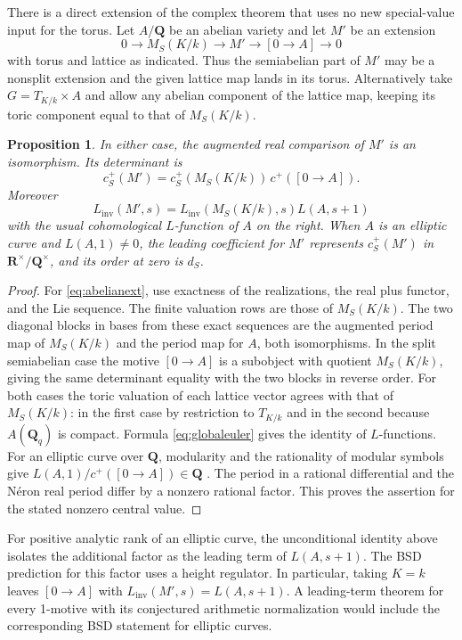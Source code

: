 \documentclass[11pt]{amsart}
\numberwithin{equation}{section}
\newtheorem{proposition}[theorem]{Proposition}
\theoremstyle{definition}
\theoremstyle{remark}
\newcommand{\Q}{\mathbf Q}
\newcommand{\R}{\mathbf R}
\begin{document}
There is a direct extension of the complex theorem that uses
no new special-value input for the torus. Let $A/\Q$ be an
abelian variety and let $M'$ be an extension
\begin{equation}\label{eq:abelianext}
 0\longrightarrow M_S(K/k)\longrightarrow M'
 \longrightarrow [0\to A]\longrightarrow0
\end{equation}
with torus and lattice as indicated. Thus the semiabelian
part of $M'$ may be a nonsplit extension and the given
lattice map lands in its torus. Alternatively take
$G=T_{K/k}\times A$ and allow any abelian component of
the lattice map, keeping its toric component equal to
that of $M_S(K/k)$.

\begin{proposition}\label{prop:abelian}
In either case, the augmented real comparison of $M'$ is
an isomorphism. Its determinant is
\[
 c_S^+(M')=c_S^+(M_S(K/k))\,c^+([0\to A]).
\]
Moreover
\[
 L_{\mathrm{inv}}(M',s)=L_{\mathrm{inv}}(M_S(K/k),s)
                  L(A,s+1)
\]
with the usual cohomological $L$-function of $A$ on the right.
When $A$ is an elliptic curve and $L(A,1)\ne0$, the
leading coefficient for $M'$ represents $c_S^+(M')$ in
$\R^\times/\Q^\times$, and its order at zero is $d_S$.
\end{proposition}

\begin{proof}
For \eqref{eq:abelianext}, use exactness of the realizations,
the real plus functor, and the Lie sequence. The finite
valuation rows are those of $M_S(K/k)$. The two diagonal
blocks in bases from these exact sequences are the augmented
period map of $M_S(K/k)$ and the period map for $A$, both
isomorphisms. In the split semiabelian case the motive $[0\to A]$
is a subobject with quotient $M_S(K/k)$, giving the same
determinant equality with the two blocks in reverse order.
For both cases the toric valuation of each lattice vector
agrees with that of $M_S(K/k)$: in the first case by
restriction to $T_{K/k}$ and in the second because
$A(\Q_q)$ is compact. Formula \eqref{eq:globaleuler}
gives the identity of $L$-functions. For an elliptic curve
over $\Q$, modularity and the rationality of modular
symbols give $L(A,1)/c^+([0\to A])\in\Q$
\cite{MTT,Stevens,Wiles,TaylorWiles,BCDT}. The period in a rational differential and the N\'eron real period
differ by a nonzero rational factor. This proves the assertion for
the stated nonzero central value.
\end{proof}

For positive analytic rank of an elliptic curve, the
unconditional identity above isolates the additional
factor as the leading term of $L(A,s+1)$.
The BSD prediction for this factor uses a height
regulator. In particular, taking $K=k$ leaves
$[0\to A]$ with $L_{\mathrm{inv}}(M',s)=L(A,s+1)$.
A leading-term theorem for every 1-motive with its
conjectured arithmetic normalization would include
the corresponding BSD statement for elliptic curves.
\end{document}
